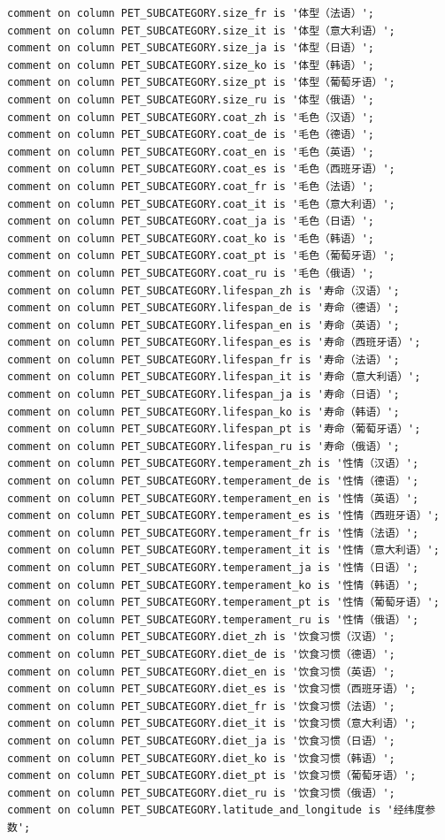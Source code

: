 \begin{verbatim}
comment on column PET_SUBCATEGORY.size_fr is '体型（法语）';
comment on column PET_SUBCATEGORY.size_it is '体型（意大利语）';
comment on column PET_SUBCATEGORY.size_ja is '体型（日语）';
comment on column PET_SUBCATEGORY.size_ko is '体型（韩语）';
comment on column PET_SUBCATEGORY.size_pt is '体型（葡萄牙语）';
comment on column PET_SUBCATEGORY.size_ru is '体型（俄语）';
comment on column PET_SUBCATEGORY.coat_zh is '毛色（汉语）';
comment on column PET_SUBCATEGORY.coat_de is '毛色（德语）';
comment on column PET_SUBCATEGORY.coat_en is '毛色（英语）';
comment on column PET_SUBCATEGORY.coat_es is '毛色（西班牙语）';
comment on column PET_SUBCATEGORY.coat_fr is '毛色（法语）';
comment on column PET_SUBCATEGORY.coat_it is '毛色（意大利语）';
comment on column PET_SUBCATEGORY.coat_ja is '毛色（日语）';
comment on column PET_SUBCATEGORY.coat_ko is '毛色（韩语）';
comment on column PET_SUBCATEGORY.coat_pt is '毛色（葡萄牙语）';
comment on column PET_SUBCATEGORY.coat_ru is '毛色（俄语）';
comment on column PET_SUBCATEGORY.lifespan_zh is '寿命（汉语）';
comment on column PET_SUBCATEGORY.lifespan_de is '寿命（德语）';
comment on column PET_SUBCATEGORY.lifespan_en is '寿命（英语）';
comment on column PET_SUBCATEGORY.lifespan_es is '寿命（西班牙语）';
comment on column PET_SUBCATEGORY.lifespan_fr is '寿命（法语）';
comment on column PET_SUBCATEGORY.lifespan_it is '寿命（意大利语）';
comment on column PET_SUBCATEGORY.lifespan_ja is '寿命（日语）';
comment on column PET_SUBCATEGORY.lifespan_ko is '寿命（韩语）';
comment on column PET_SUBCATEGORY.lifespan_pt is '寿命（葡萄牙语）';
comment on column PET_SUBCATEGORY.lifespan_ru is '寿命（俄语）';
comment on column PET_SUBCATEGORY.temperament_zh is '性情（汉语）';
comment on column PET_SUBCATEGORY.temperament_de is '性情（德语）';
comment on column PET_SUBCATEGORY.temperament_en is '性情（英语）';
comment on column PET_SUBCATEGORY.temperament_es is '性情（西班牙语）';
comment on column PET_SUBCATEGORY.temperament_fr is '性情（法语）';
comment on column PET_SUBCATEGORY.temperament_it is '性情（意大利语）';
comment on column PET_SUBCATEGORY.temperament_ja is '性情（日语）';
comment on column PET_SUBCATEGORY.temperament_ko is '性情（韩语）';
comment on column PET_SUBCATEGORY.temperament_pt is '性情（葡萄牙语）';
comment on column PET_SUBCATEGORY.temperament_ru is '性情（俄语）';
comment on column PET_SUBCATEGORY.diet_zh is '饮食习惯（汉语）';
comment on column PET_SUBCATEGORY.diet_de is '饮食习惯（德语）';
comment on column PET_SUBCATEGORY.diet_en is '饮食习惯（英语）';
comment on column PET_SUBCATEGORY.diet_es is '饮食习惯（西班牙语）';
comment on column PET_SUBCATEGORY.diet_fr is '饮食习惯（法语）';
comment on column PET_SUBCATEGORY.diet_it is '饮食习惯（意大利语）';
comment on column PET_SUBCATEGORY.diet_ja is '饮食习惯（日语）';
comment on column PET_SUBCATEGORY.diet_ko is '饮食习惯（韩语）';
comment on column PET_SUBCATEGORY.diet_pt is '饮食习惯（葡萄牙语）';
comment on column PET_SUBCATEGORY.diet_ru is '饮食习惯（俄语）';
comment on column PET_SUBCATEGORY.latitude_and_longitude is '经纬度参数';
\end{verbatim}

